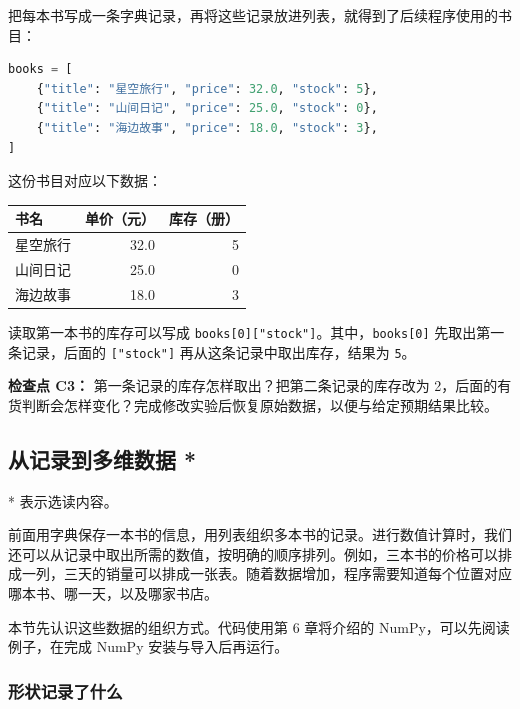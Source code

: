 \documentclass[UTF8,a4paper,11pt,fontset=fandol]{ctexart}
\providecommand{\passthrough}[1]{#1}
\begin{document}
把每本书写成一条字典记录，再将这些记录放进列表，就得到了后续程序使用的书目：

\begin{lstlisting}[language=Python]
books = [
    {"title": "星空旅行", "price": 32.0, "stock": 5},
    {"title": "山间日记", "price": 25.0, "stock": 0},
    {"title": "海边故事", "price": 18.0, "stock": 3},
]
\end{lstlisting}

这份书目对应以下数据：

\begin{longtable}[]{@{}lrr@{}}
\toprule\noalign{}
书名 & 单价（元） & 库存（册） \\
\midrule\noalign{}
\endhead
\bottomrule\noalign{}
\endlastfoot
星空旅行 & 32.0 & 5 \\
山间日记 & 25.0 & 0 \\
海边故事 & 18.0 & 3 \\
\end{longtable}

读取第一本书的库存可以写成 \passthrough{\lstinline!books[0]["stock"]!}。其中，\passthrough{\lstinline!books[0]!} 先取出第一条记录，后面的 \passthrough{\lstinline!["stock"]!} 再从这条记录中取出库存，结果为 \passthrough{\lstinline!5!}。

\textbf{检查点 C3：} 第一条记录的库存怎样取出？把第二条记录的库存改为 2，后面的有货判断会怎样变化？完成修改实验后恢复原始数据，以便与给定预期结果比较。

\clearpage

\subsection{从记录到多维数据 *}\label{ux4eceux8bb0ux5f55ux5230ux591aux7ef4ux6570ux636e}

* 表示选读内容。

前面用字典保存一本书的信息，用列表组织多本书的记录。进行数值计算时，我们还可以从记录中取出所需的数值，按明确的顺序排列。例如，三本书的价格可以排成一列，三天的销量可以排成一张表。随着数据增加，程序需要知道每个位置对应哪本书、哪一天，以及哪家书店。

本节先认识这些数据的组织方式。代码使用第 6 章将介绍的 NumPy，可以先阅读例子，在完成 NumPy 安装与导入后再运行。

\subsubsection{形状记录了什么}\label{ux5f62ux72b6ux8bb0ux5f55ux4e86ux4ec0ux4e48}
\end{document}
